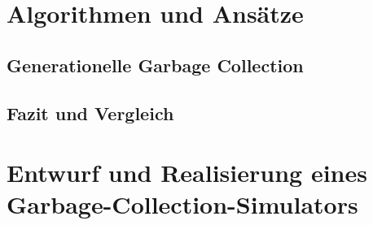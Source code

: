 
\listfiles


\listoftodos



\cleardoublepage

\setcounter{page}{1}
\pagestyle{maincontentstyle}


\part{Algorithmen und Ansätze}



\chapter{Generationelle Garbage Collection}	%
\chapter{Fazit und Vergleich}		%

\part{Entwurf und Realisierung eines Garbage-Collection-Simulators}

\cleardoublepage






